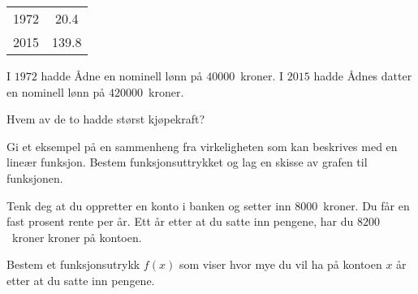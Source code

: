 \Oppgave[2] 

\begin{table}[H]
  \centering
  \label{tab:Forkurs-1p-2p-laererutdanning-2016-V-U-oppgave-1-10}
  \begin{tabular}{| S[table-format=4.0] | S[table-format=3.1] |}
      1972 &  20.4 \\
      2015 & 139.8 \\ \hline
  \end{tabular}
\end{table}

I $1972$ hadde Ådne en nominell lønn på $\num{40000}$~kroner. I $2015$ hadde
Ådnes datter en nominell lønn på $\num{420000}$~kroner. \bigskip

Hvem av de to hadde størst kjøpekraft?


\Oppgave[2] 

Gi et eksempel på en sammenheng fra virkeligheten som kan beskrives med en
lineær funksjon. Bestem funksjonsuttrykket og lag en skisse av grafen til
funksjonen.


\Oppgave[2] 

Tenk deg at du oppretter en konto i banken og setter inn $\num{8000}$~kroner. Du
får en fast prosent rente per år. Ett år etter at du satte inn pengene, har du
$\num{8200}$~kroner kroner på kontoen. \bigskip

Bestem et funksjonsutrykk $f(x)$ som viser hvor mye du vil ha på kontoen $x$ år
etter at du satte inn pengene.



